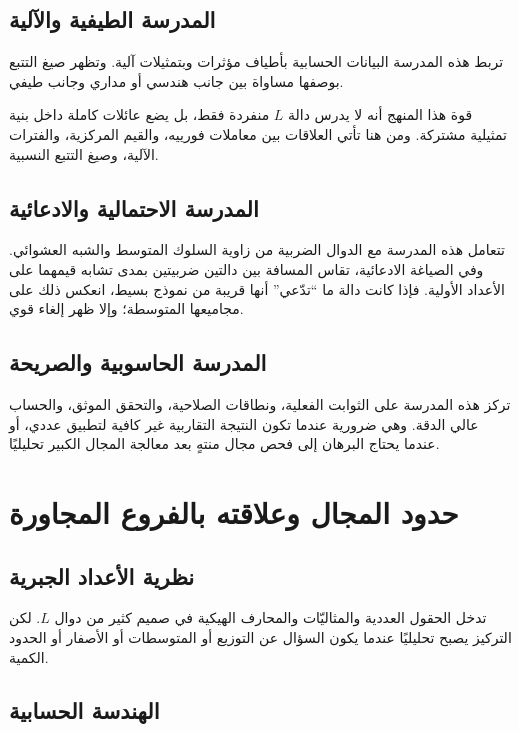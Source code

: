 \subsection{المدرسة الطيفية والآلية}

تربط هذه المدرسة البيانات الحسابية بأطياف مؤثرات وبتمثيلات آلية. وتظهر صيغ التتبع بوصفها مساواة بين جانب هندسي أو مداري وجانب طيفي.

قوة هذا المنهج أنه لا يدرس دالة \(L\) منفردة فقط، بل يضع عائلات كاملة داخل بنية تمثيلية مشتركة. ومن هنا تأتي العلاقات بين معاملات فورييه، والقيم المركزية، والفترات الآلية، وصيغ التتبع النسبية.

\subsection{المدرسة الاحتمالية والادعائية}

تتعامل هذه المدرسة مع الدوال الضربية من زاوية السلوك المتوسط والشبه العشوائي. وفي الصياغة الادعائية، تقاس المسافة بين دالتين ضربيتين بمدى تشابه قيمهما على الأعداد الأولية. فإذا كانت دالة ما ``تدّعي'' أنها قريبة من نموذج بسيط، انعكس ذلك على مجاميعها المتوسطة؛ وإلا ظهر إلغاء قوي.

\subsection{المدرسة الحاسوبية والصريحة}

تركز هذه المدرسة على الثوابت الفعلية، ونطاقات الصلاحية، والتحقق الموثق، والحساب عالي الدقة. وهي ضرورية عندما تكون النتيجة التقاربية غير كافية لتطبيق عددي، أو عندما يحتاج البرهان إلى فحص مجال منتهٍ بعد معالجة المجال الكبير تحليليًا.

\section{حدود المجال وعلاقته بالفروع المجاورة}

\subsection{نظرية الأعداد الجبرية}

تدخل الحقول العددية والمثاليّات والمحارف الهيكية في صميم كثير من دوال \(L\). لكن التركيز يصبح تحليليًا عندما يكون السؤال عن التوزيع أو المتوسطات أو الأصفار أو الحدود الكمية.

\subsection{الهندسة الحسابية}

